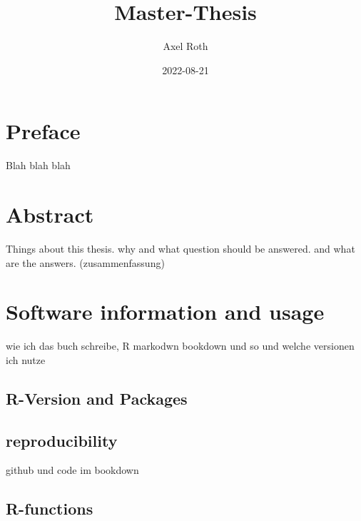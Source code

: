 \documentclass[
  oneside]{book}
\title{Master-Thesis}
\author{Axel Roth}
\date{2022-08-21}
\begin{document}
\maketitle

{
\setcounter{tocdepth}{1}
\tableofcontents
}
\hypertarget{preface}{%
\chapter*{Preface}\label{preface}}

\renewcommand{\chaptermark}[1]{\markboth{\uppercase{#1}}{\uppercase{#1}}}

Blah blah blah

\renewcommand{\chaptermark}[1]{\markboth{\uppercase{\thechapter. \ #1}}{}}

\hypertarget{abstract}{%
\chapter{Abstract}\label{abstract}}

Things about this thesis. why and what question should be answered. and what are the answers. (zusammenfassung)

\hypertarget{software-information-and-usage}{%
\chapter{Software information and usage}\label{software-information-and-usage}}

wie ich das buch schreibe, R markodwn bookdown und so und welche versionen ich nutze

\hypertarget{r-version-and-packages}{%
\section{R-Version and Packages}\label{r-version-and-packages}}

\hypertarget{reproducibility}{%
\section{reproducibility}\label{reproducibility}}

github und code im bookdown

\hypertarget{r-functions}{%
\section{R-functions}\label{r-functions}}
\end{document}
